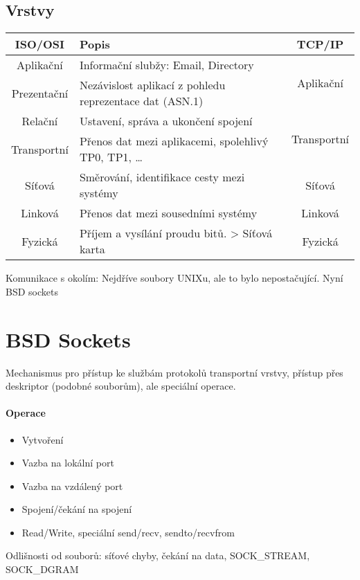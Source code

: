 \documentclass[a4paper, 11pt]{report}
\begin{document}
\subsection{Vrstvy}
\shorthandoff{-}
\begin{tabular}{ |c | l | c |}
\hline
ISO/OSI		& Popis & TCP/IP \\ \hline \hline
Aplikační	& Informační slubžy: Email, Directory & \multirow{3}{*}{Aplikační} \\ \cline{1-2}
Prezentační	& Nezávislost aplikací z pohledu reprezentace dat (ASN.1)  & \\ \cline{1-2}
\multirow{2}{*}{Relační}	& \multirow{2}{*}{Ustavení, správa a ukončení spojení} &	\\ \cline{3-3}
 & & \multirow{2}{*}{Transportní} \\ \cline{1-2}
Transportní & Přenos dat mezi aplikacemi, spolehlivý TP0, TP1, \dots & \\ \hline
Síťová		& Směrování, identifikace cesty mezi systémy & Síťová \\ \hline
Linková		& Přenos dat mezi sousedními systémy	& Linková \\ \hline
Fyzická		& Příjem a vysílání proudu bitů. > Síťová karta & Fyzická \\ \hline
\end{tabular}
\shorthandon{-}

Komunikace s okolím: Nejdříve soubory UNIXu, ale to bylo nepostačující. Nyní BSD sockets

\section{BSD Sockets}
Mechanismus pro přístup ke službám protokolů transportní vrstvy, přístup přes deskriptor (podobné souborům), ale speciální operace.

\paragraph{Operace}
\begin{itemize}
	\item Vytvoření
	\item Vazba na lokální port
	\item Vazba na vzdálený port
	\item Spojení/čekání na spojení
	\item Read/Write, speciální send/recv, sendto/recvfrom
\end{itemize}

Odlišnosti od souborů:  síťové chyby, čekání na data, SOCK\_STREAM, SOCK\_DGRAM
\end{document}
